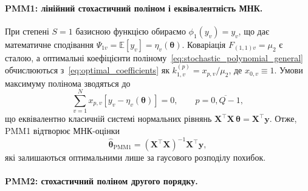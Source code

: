 \documentclass[12pt,a4paper]{article}
\begin{document}
\paragraph{PMM1: лінійний стохастичний поліном і еквівалентність МНК.}

При степені $S=1$ базисною функцією обираємо $\phi_1(y_v) = y_v$, що дає математичне сподівання $\Psi_{1v} = \mathbb{E}[y_v] = \eta_v(\boldsymbol{\theta})$. Коваріація $F_{(1,1)v} = \mu_2$ є сталою, а оптимальні коефіцієнти поліному~\eqref{eq:stochastic_polynomial_general} обчислюються з~\eqref{eq:optimal_coefficients} як $k_{1,v}^{(p)} = x_{p,v}/\mu_2$, де $x_{0,v} \equiv 1$. Умови максимуму полінома зводяться до
\begin{equation}
\label{eq:pmm1_system}
\sum_{v=1}^{N} x_{p,v} \left[ y_v - \eta_v(\boldsymbol{\theta}) \right] = 0,\qquad p = \overline{0,Q-1},
\end{equation}
що еквівалентно класичній системі нормальних рівнянь $\boldsymbol{X}^\top \boldsymbol{X}\,\boldsymbol{\theta} = \boldsymbol{X}^\top \boldsymbol{y}$. Отже, PMM1 відтворює МНК-оцінки
\begin{equation}
\label{eq:pmm1_solution}
\hat{\boldsymbol{\theta}}_{\mathrm{PMM1}} = (\boldsymbol{X}^\top \boldsymbol{X})^{-1} \boldsymbol{X}^\top \boldsymbol{y},
\end{equation}
які залишаються оптимальними лише за гаусового розподілу похибок.

\paragraph{PMM2: стохастичний поліном другого порядку.}
\end{document}
